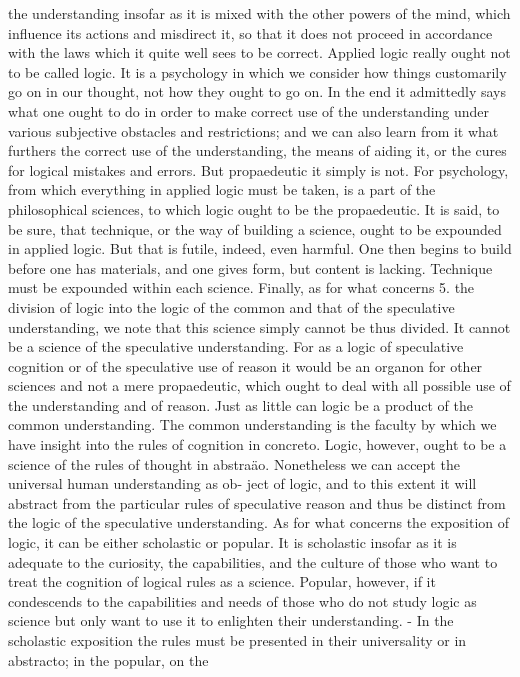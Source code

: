 the understanding insofar as it is mixed with the other powers of the mind,
which influence its actions and misdirect it, so that it does not proceed in
accordance with the laws which it quite well sees to be correct. Applied
logic really ought not to be called logic. It is a psychology in which we
consider how things customarily go on in our thought, not how they ought
to go on. In the end it admittedly says what one ought to do in order to
make correct use of the understanding under various subjective obstacles
and restrictions; and we can also learn from it what furthers the correct
use of the understanding, the means of aiding it, or the cures for logical
mistakes and errors. But propaedeutic it simply is not. For psychology,
from which everything in applied logic must be taken, is a part of the
philosophical sciences, to which logic ought to be the propaedeutic.
It is said, to be sure, that technique, or the way of building a science,
ought to be expounded in applied logic. But that is futile, indeed, even
harmful. One then begins to build before one has materials, and one gives
form, but content is lacking. Technique must be expounded within each
science.
Finally, as for what concerns
5.
the division of logic into the logic of the common and that of the speculative
understanding, we note that this science simply cannot be thus divided.
It cannot be a science of the speculative understanding. For as a logic of
speculative cognition or of the speculative use of reason it would be an
organon for other sciences and not a mere propaedeutic, which ought to
deal with all possible use of the understanding and of reason.
Just as little can logic be a product of the common understanding. The
common understanding is the faculty by which we have insight into the
rules of cognition in concreto. Logic, however, ought to be a science of the
rules of thought in abstraäo.
Nonetheless we can accept the universal human understanding as ob-
ject of logic, and to this extent it will abstract from the particular rules of
speculative reason and thus be distinct from the logic of the speculative
understanding.
As for what concerns the exposition of logic, it can be either scholastic or
popular.
It is scholastic insofar as it is adequate to the curiosity, the capabilities,
and the culture of those who want to treat the cognition of logical rules as
a science. Popular, however, if it condescends to the capabilities and needs
of those who do not study logic as science but only want to use it to
enlighten their understanding. - In the scholastic exposition the rules
must be presented in their universality or in abstracto; in the popular, on the
